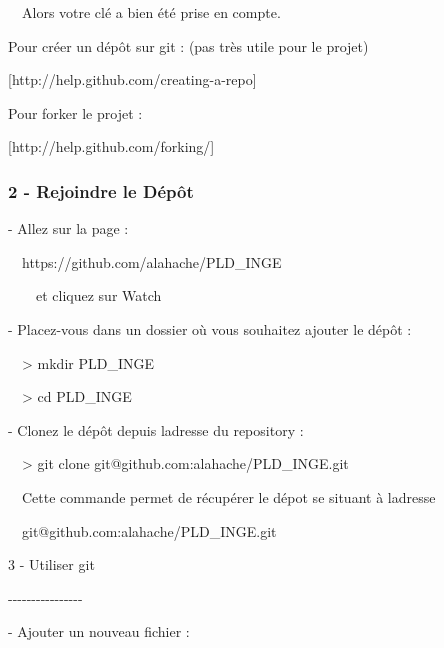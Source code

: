 \documentclass{article}
\begin{document}
\bigskip


\bigskip

\ \ Alors votre clé a bien été prise en compte.


\bigskip


\bigskip

Pour créer un dépôt sur git : (pas très utile pour le projet)

[http://help.github.com/creating-a-repo]


\bigskip

Pour forker le projet :

[http://help.github.com/forking/]


\bigskip

\subsubsection[2 {}- Rejoindre le Dépôt]{2 - Rejoindre le Dépôt}

\bigskip

{}- Allez sur la page :

\ \ https://github.com/alahache/PLD\_INGE

\ \ \ \ et cliquez sur {\textquotedbl}Watch{\textquotedbl}


\bigskip


\bigskip

{}- Placez-vous dans un dossier où vous souhaitez ajouter le dépôt :

\ \ {\textgreater} mkdir PLD\_INGE

\ \ {\textgreater} cd PLD\_INGE


\bigskip


\bigskip

{}- Clonez le dépôt depuis l{\textquotesingle}adresse du repository :

\ \ {\textgreater} git clone git@github.com:alahache/PLD\_INGE.git


\bigskip

\ \ Cette commande permet de récupérer le dépot se situant à
l{\textquotesingle}adresse

\ \ git@github.com:alahache/PLD\_INGE.git


\bigskip


\bigskip


\bigskip

3 - Utiliser git

{}-{}-{}-{}-{}-{}-{}-{}-{}-{}-{}-{}-{}-{}-{}-{}-


\bigskip

{}- Ajouter un nouveau fichier :
\end{document}
